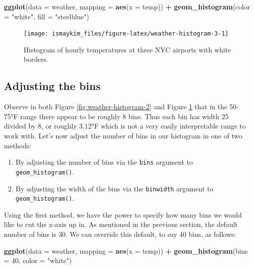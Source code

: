 \documentclass[12pt, krantz2,]{krantz}
\makeatletter
\newenvironment{Shaded}{\begin{snugshade}}{\end{snugshade}}
\newcommand{\DataTypeTok}[1]{\textcolor[rgb]{0.27,0.27,0.27}{#1}}
\newcommand{\DecValTok}[1]{\textcolor[rgb]{0.06,0.06,0.06}{#1}}
\newcommand{\KeywordTok}[1]{\textcolor[rgb]{0.27,0.27,0.27}{\textbf{#1}}}
\newcommand{\NormalTok}[1]{#1}
\newcommand{\OperatorTok}[1]{\textcolor[rgb]{0.43,0.43,0.43}{\textbf{#1}}}
\newcommand{\StringTok}[1]{\textcolor[rgb]{0.5,0.5,0.5}{#1}}
\providecommand{\tightlist}{%
  \setlength{\itemsep}{0pt}\setlength{\parskip}{0pt}}
\newenvironment{kframe}{%
\medskip{}
\setlength{\fboxsep}{.8em}
 \def\at@end@of@kframe{}%
 \ifinner\ifhmode%
  \def\at@end@of@kframe{\end{minipage}}%
  \begin{minipage}{\columnwidth}%
 \fi\fi%
 \def\FrameCommand##1{\hskip\@totalleftmargin \hskip-\fboxsep
 \colorbox{shadecolor}{##1}\hskip-\fboxsep
     \hskip-\linewidth \hskip-\@totalleftmargin \hskip\columnwidth}%
 \MakeFramed {\advance\hsize-\width
   \@totalleftmargin\z@ \linewidth\hsize
   \@setminipage}}%
 {\par\unskip\endMakeFramed%
 \at@end@of@kframe}
\renewenvironment{Shaded}{\begin{kframe}}{\end{kframe}}
\makeatother
\begin{document}
\begin{Shaded}
\begin{Highlighting}[]
\KeywordTok{ggplot}\NormalTok{(}\DataTypeTok{data =}\NormalTok{ weather, }\DataTypeTok{mapping =} \KeywordTok{aes}\NormalTok{(}\DataTypeTok{x =}\NormalTok{ temp)) }\OperatorTok{+}
\StringTok{  }\KeywordTok{geom_histogram}\NormalTok{(}\DataTypeTok{color =} \StringTok{"white"}\NormalTok{, }\DataTypeTok{fill =} \StringTok{"steelblue"}\NormalTok{)}
\end{Highlighting}
\end{Shaded}

\begin{figure}

{\centering \texttt{[image: ismaykim\_files/figure-latex/weather-histogram-3-1]} 

}

\caption{Histogram of hourly temperatures at three NYC airports with white borders.}\label{fig:weather-histogram-3}
\end{figure}

\hypertarget{adjustbins}{%
\subsection{Adjusting the bins}\label{adjustbins}}

Observe in both Figure \ref{fig:weather-histogram-2} and Figure \ref{fig:weather-histogram-3} that in the 50-75°F range there appear to be roughly 8 bins. Thus each bin has width 25 divided by 8, or roughly 3.12°F which is not a very easily interpretable range to work with. Let's now adjust the number of bins in our histogram in one of two methods:

\begin{enumerate}
\def\labelenumi{\arabic{enumi}.}
\tightlist
\item
  By adjusting the number of bins via the \texttt{bins} argument to \texttt{geom\_histogram()}.
\item
  By adjusting the width of the bins via the \texttt{binwidth} argument to \texttt{geom\_histogram()}.
\end{enumerate}

Using the first method, we have the power to specify how many bins we would like to cut the x-axis up in. As mentioned in the previous section, the default number of bins is 30. We can override this default, to say 40 bins, as follows:

\begin{Shaded}
\begin{Highlighting}[]
\KeywordTok{ggplot}\NormalTok{(}\DataTypeTok{data =}\NormalTok{ weather, }\DataTypeTok{mapping =} \KeywordTok{aes}\NormalTok{(}\DataTypeTok{x =}\NormalTok{ temp)) }\OperatorTok{+}
\StringTok{  }\KeywordTok{geom_histogram}\NormalTok{(}\DataTypeTok{bins =} \DecValTok{40}\NormalTok{, }\DataTypeTok{color =} \StringTok{"white"}\NormalTok{)}
\end{Highlighting}
\end{Shaded}
\end{document}

